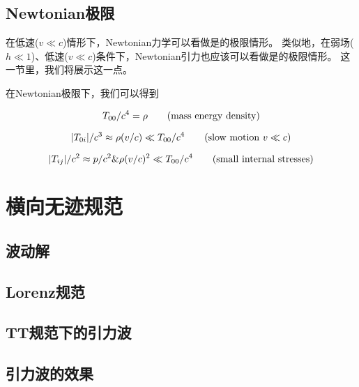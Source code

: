 \subsection{Newtonian极限}
在低速($v \ll c$)情形下，Newtonian力学可以看做是\SR 的极限情形。
类似地，在弱场($h \ll 1$)、低速($v \ll c$)条件下，Newtonian引力也应该可以看做是\GR 的极限情形。
这一节里，我们将展示这一点。

在Newtonian极限下，我们可以得到

\begin{equation}\label{eq:Density}
  T_{00}/c^4 = \rho \qquad ({\rm mass~energy~density})
\end{equation}

\begin{equation}\label{eq:slow}
  | T_{0i}| /c^3 \approx \rho (v/c) \ll T_{00}/c^4 \qquad ({\rm slow~motion}~v \ll c)
\end{equation}

\begin{equation}\label{eq:small}
  | T_{ij}| /c^2 \approx p/c^2 \& \rho(v/c)^2 \ll T_{00}/c^4 \qquad ({\rm small~internal~stresses})
\end{equation}

\section{横向无迹规范}

\subsection{波动解}

\subsection{Lorenz规范}

\subsection{TT规范下的引力波}

\subsection{引力波的效果}
